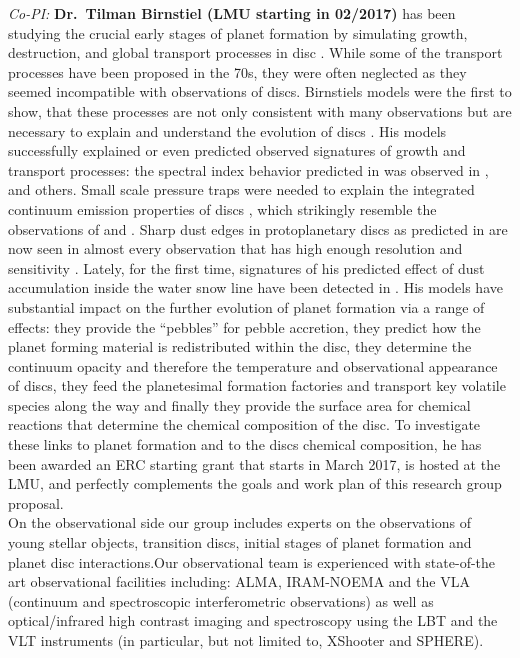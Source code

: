 \documentclass[10pt,fleqn,twoside]{article}
\begin{document}
\textit{Co-PI:} \textbf{Dr.\ Tilman Birnstiel (LMU starting in 02/2017)} has been
studying the crucial early stages of planet formation by simulating growth,
destruction, and global transport processes in disc
\citep[e.g.][]{2010A&A...513A..79B}. While some of the transport processes have
been proposed in the 70s, they were often neglected as they seemed incompatible
with observations of discs. Birnstiels models were the first to show, that these
processes are not only consistent with many observations but are necessary to
explain and understand the evolution of discs \citep{2010A&A...516L..14B}. His
models successfully explained or even predicted observed signatures of growth
and transport processes: the spectral index behavior predicted in
\citet{2010A&A...516L..14B} was observed in \citet{2012ApJ...760L..17P},
\citet{2016A&A...588A..53T} and others. Small scale pressure traps were needed
to explain the integrated continuum emission properties of discs
\citep{2012A&A...538A.114P}, which strikingly resemble the observations of
\citet{2015ApJ...808L...3A} and \citet{2016ApJ...820L..40A}. Sharp dust edges in
protoplanetary discs as predicted in \citet{2014ApJ...780..153B} are now seen in
almost every observation that has high enough resolution and sensitivity
\citep[e.g.][]{2016ApJ...820L..40A,2013A&A...557A.133D}. Lately, for the first
time, signatures of his predicted effect of dust accumulation inside the water
snow line \citet{2010A&A...513A..79B} have been detected in
\citet{2016Natur.535..258C}. His models have substantial impact on the further
evolution of planet formation via a range of effects: they provide the
``pebbles'' for pebble accretion, they predict how the planet forming material
is redistributed within the disc, they determine the continuum opacity and
therefore the temperature and observational appearance of discs, they feed the
planetesimal formation factories and transport key volatile species along the
way and finally they provide the surface area for chemical reactions that determine the
chemical composition of the disc. To investigate these links to planet formation
and to the discs chemical composition, he has been awarded an ERC starting grant
that starts in March 2017, is hosted at the LMU, and perfectly complements
the goals and work plan of this research group proposal.\\

 On the observational side our group includes experts on the
 observations of young stellar objects, transition discs, initial stages of
 planet formation and planet disc interactions.Our observational team
 is experienced with state-of-the art observational facilities
 including: ALMA, IRAM-NOEMA and the VLA (continuum and spectroscopic
 interferometric observations) as well as optical/infrared high
 contrast imaging and spectroscopy using the LBT and the VLT
 instruments (in particular, but not limited to, XShooter and
 SPHERE).\\ 
\end{document}
